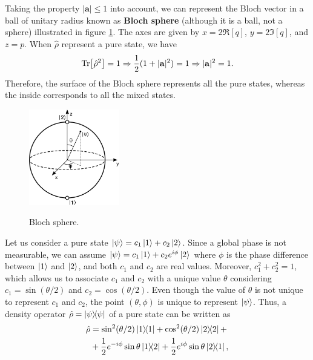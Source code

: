 Taking the property $ |\mathbf{a}| \leq 1 $ into account, we can represent the Bloch vector in a ball of unitary radius known as \textbf{Bloch sphere} (although it is a ball, not a sphere) illustrated in figure \ref{fig:Bloch-sphere}. The axes are given by $x = 2\Re[q]$, $ y = 2\Im[q] $, and $ z = p $. When $ \hat{\rho} $ represent a pure state, we have
\begin{equation}
	\Tr[\hat{\rho}^2] = 1 \Rightarrow \frac{1}{2}(1 + |\mathbf{a}|^2) = 1 \Rightarrow |\mathbf{a}|^2 = 1.
\end{equation}
Therefore, the surface of the Bloch sphere represents all the pure states, whereas the inside corresponds to all the mixed states.

\noindent
\begin{minipage}{\textwidth}
	\begin{figure}
		\centering
		\vspace{-10pt}
		\caption{Bloch sphere.}
		\includegraphics[width=0.35\textwidth]{USPSC-img/Bloch_sphere.png}
		\label{fig:Bloch-sphere}
		\vspace{-5pt}
	\end{figure}
	Let us consider a pure state $ \ket{\psi} = c_1\ket{1} + c_2\ket{2} $. Since a global phase is not measurable, we can assume $ \ket{\psi} = c_1 \ket{1} + c_2 e^{i\phi} \ket{2} $ where $ \phi $ is the phase difference between $ \ket{1} $ and $ \ket{2} $, and both $ c_1 $ and $ c_2 $ are real values. Moreover, $ c_1^2 + c_2^2 = 1 $, which allows us to associate $ c_1 $ and $ c_2 $ with a unique value $ \theta $ considering $ c_1 = \sin{(\theta/2)} $ and $ c_2 = \cos{(\theta/2)} $. Even though the value of $ \theta $ is not unique to represent $ c_1 $ and $ c_2 $, the point $ (\theta, \phi) $ is unique to represent $ \ket{\psi} $. Thus, a density operator $ \hat{\rho} = \ketbra{\psi}{\psi} $ of a pure state can be written as
	\begin{align}
		\hat{\rho} &= \sin^2(\theta/2) \ketbra{1}{1} + \cos^2(\theta/2) \ketbra{2}{2} + \nonumber 
		\\
		&+ \frac{1}{2}e^{-i\phi}\sin\theta \ketbra{1}{2} + \frac{1}{2}e^{i\phi}\sin\theta \ketbra{2}{1},
	\end{align}
\end{minipage}

